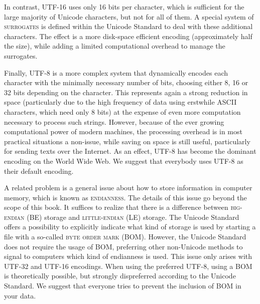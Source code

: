 In contrast, \textsc{UTF-16} uses only 16 bits per character, which is
sufficient for the large majority of Unicode characters, but not for all of
them. A special system of \textsc{surrogates} is defined within the Unicode
Standard to deal with these additional characters. The effect is a more
disk-space efficient encoding (approximately half the size), while adding a
limited computational overhead to manage the surrogates. 

Finally, \textsc{UTF-8} is a more complex system that dynamically encodes each
character with the minimally necessary number of bits, choosing either 8, 16 or
32 bits depending on the character. This represents again a strong reduction in
space (particularly due to the high frequency of data using erstwhile ASCII
characters, which need only 8 bits) at the expense of even more computation
necessary to process such strings. However, because of the ever growing
computational power of modern machines, the processing overhead is in most
practical situations a non-issue, while saving on space is still useful,
particularly for sending texts over the Internet. As an effect, UTF-8 has become
the dominant encoding on the World Wide Web. We suggest that everybody uses
UTF-8 as their default encoding.

A related problem is a general issue about how to store information in computer
memory, which is known as \textsc{endianness}. The details of this issue go
beyond the scope of this book. It suffices to realize that there is a difference
between \textsc{big-endian} (BE) storage and \textsc{little-endian} (LE)
storage. The Unicode Standard offers a possibility to explicitly indicate what
kind of storage is used by starting a file with a so-called \textsc{byte order
mark} (BOM). However, the Unicode Standard does not require the usage of BOM,
preferring other non-Unicode methods to signal to computers which kind of
endianness is used. This issue only arises with UTF-32 and UTF-16 encodings.
When using the preferred UTF-8, using a BOM is theoretically possible, but
strongly dispreferred according to the Unicode Standard. We suggest that
everyone tries to prevent the inclusion of BOM in your data.




